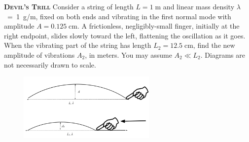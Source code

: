 \begin{problem}{\textbf{\textsc{Devil's Trill}}}
Consider a string of length $L=1\;\mathrm{m}$ and linear mass density $\lambda$\ =\ 1\ g/m, fixed on both ends and vibrating in the first normal mode with amplitude $A = 0.125 \; \mathrm{cm}$. A frictionless, negligibly-small finger, initially at the right endpoint, slides slowly toward the left, flattening the oscillation as it goes. When the vibrating part of the string has length $L_2=12.5\;\mathrm{cm}$, find the new amplitude of vibrations $A_2$, in meters. You may assume $A_2\ll L_2$. Diagrams are not necessarily drawn to scale. 

\FloatBarrier
\begin{figure}[!htbp]
\centering
\includegraphics[width=0.6\textwidth]{problems/figures/devilTrill.png}
\end{figure}
\FloatBarrier



\end{problem}